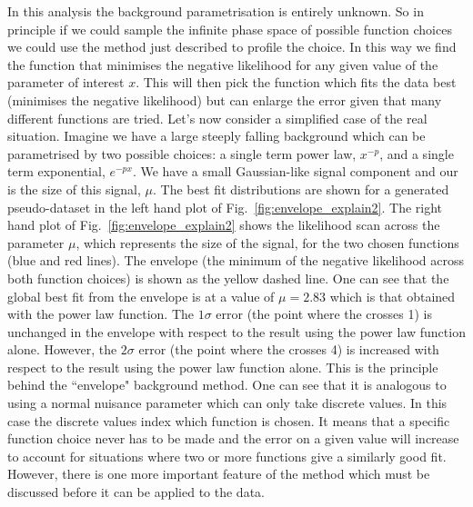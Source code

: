In this analysis the background parametrisation is entirely unknown. So in principle if we could sample the infinite phase space of possible function choices we could use the method just described to profile the choice. In this way we find the function that minimises the negative likelihood for any given value of the parameter of interest $x$. This will then pick the function which fits the data best (minimises the negative likelihood) but can enlarge the error given that many different functions are tried.
Let's now consider a simplified case of the real situation. Imagine we have a large steeply falling background which can be parametrised by two possible choices: a single term power law, $x^{-p}$, and a single term exponential, $e^{-px}$. We have a small Gaussian-like signal component and our \POI is the size of this signal, $\mu$. The best fit distributions are shown for a generated pseudo-dataset in the left hand plot of Fig.~\ref{fig:envelope_explain2}. The right hand plot of Fig.~\ref{fig:envelope_explain2} shows the likelihood scan across the parameter $\mu$, which represents the size of the signal, for the two chosen functions (blue and red lines). The envelope (the minimum of the negative likelihood across both function choices) is shown as the yellow dashed line. One can see that the global best fit from the envelope is at a value of $\mu=2.83$ which is that obtained with the power law function. The $1\sigma$ error (the point where the \NLL crosses 1) is unchanged in the envelope with respect to the result using the power law function alone. However, the $2\sigma$ error (the point where the \NLL crosses 4) is increased with respect to the result using the power law function alone. This is the principle behind the ``envelope" background method. One can see that it is analogous to using a normal nuisance parameter which can only take discrete values. In this case the discrete values index which function is chosen. It means that a specific function choice never has to be made and the error on a given value will increase to account for situations where two or more functions give a similarly good fit. However, there is one more important feature of the method which must be discussed before it can be applied to the data.

